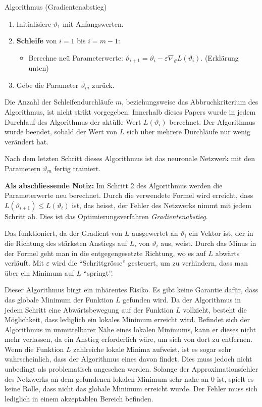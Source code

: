 \begin{aufgabe}
    Algorithmus (Gradientenabstieg)
    \begin{enumerate}
        \item Initialisiere \( \vartheta_1 \) mit Anfangswerten.
        \item \textbf{Schleife} von \( i = 1 \) bis \( i = m - 1 \):
        \begin{itemize}
            \item Berechne neü Parameterwerte: \( \vartheta_{i+1} = \vartheta_i - \varepsilon \nabla_\vartheta L\left(\vartheta_i\right) \). (Erklärung unten)
        \end{itemize}
        \item Gebe die Parameter \( \vartheta_m \) zurück.
    \end{enumerate}
    \label{neuronal:gradient_descent}
\end{aufgabe}

Die Anzahl der Schleifendurchläufe \( m \), beziehungsweise das Abbruchkriterium des Algorithmus, ist nicht strikt vorgegeben.
Innerhalb dieses Papers wurde in jedem Durchlauf des Algorithmus der aktülle Wert \( L(\vartheta_i) \) berechnet.
Der Algorithmus wurde beendet, sobald der Wert von \( L \) sich über mehrere Durchläufe nur wenig verändert hat.

Nach dem letzten Schritt dieses Algorithmus ist das neuronale Netzwerk mit den Parametern \( \vartheta_m \) fertig trainiert.

\textbf{Als abschliessende Notiz:} Im Schritt 2 des Algorithmus werden die Parameterwerte neu berechnet.
Durch die verwendete Formel wird erreicht, dass \( L(\vartheta_{i+1}) \leq L(\vartheta_i) \) ist, das heisst, der Fehler des Netzwerks nimmt mit jedem Schritt ab.
Dies ist das Optimierungsverfahren \emph{Gradientenabstieg}.

Das funktioniert, da der Gradient von \( L \) ausgewertet an \( \vartheta_i \) ein Vektor ist, der in die Richtung des stärksten Anstiegs auf \( L \), von \(\vartheta_i \) aus, weist.
Durch das Minus in der Formel geht man in die entgegengesetzte Richtung, wo es auf \( L \) abwärts verläuft. 
Mit \( \varepsilon \) wird die ``Schrittgrösse'' gesteuert, um zu verhindern, dass man über ein Minimum auf \( L \) ``springt''.

Dieser Algorithmus birgt ein inhärentes Risiko.
Es gibt keine Garantie dafür, dass das globale Minimum der Funktion \( L \) gefunden wird.
Da der Algorithmus in jedem Schritt eine Abwärtsbewegung auf der Funktion \( L \) vollzieht, besteht die Möglichkeit, dass lediglich ein lokales Minimum erreicht wird.
Befindet sich der Algorithmus in unmittelbarer Nähe eines lokalen Minimums, kann er dieses nicht mehr verlassen, da ein Anstieg erforderlich wäre, um sich von dort zu entfernen.
Wenn die Funktion \( L \) zahlreiche lokale Minima aufweist, ist es sogar sehr wahrscheinlich, dass der Algorithmus eines davon findet.
Dies muss jedoch nicht unbedingt als problematisch angesehen werden.
Solange der Approximationsfehler des Netzwerks an dem gefundenen lokalen Minimum sehr nahe an 0 ist, spielt es keine Rolle, dass nicht das globale Minimum erreicht wurde. 
Der Fehler muss sich lediglich in einem akzeptablen Bereich befinden.

